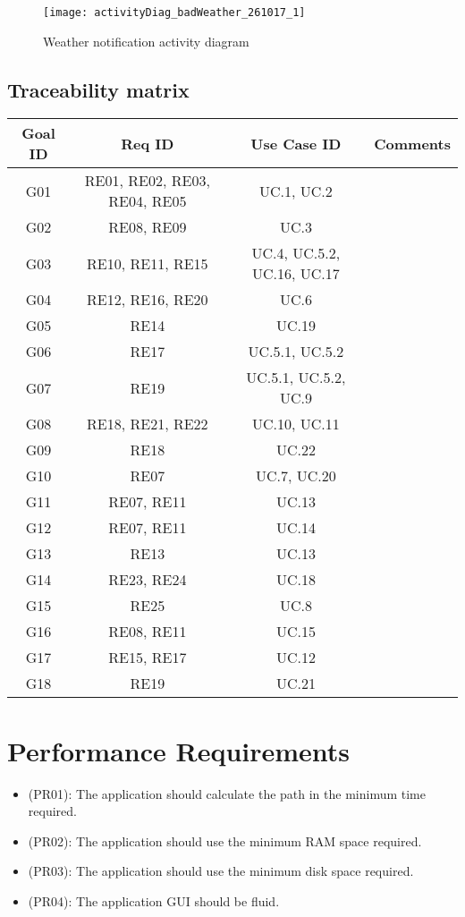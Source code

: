 \documentclass[a4paper,leqno]{book}
\begin{document}
\begin{figure}[!h]
	\begin{center}
		\texttt{[image: activityDiag\_badWeather\_261017\_1]}
	\end{center}
	\caption{Weather notification activity diagram}
\end{figure}

\subsection{Traceability matrix}
\begin{tabular}{|c|c|c|c|}
	\hline 
	\textbf{Goal ID}&  \textbf{Req ID}& \textbf{Use Case ID} & \textbf{Comments} \\ 
	\hline  \hline
	G01& RE01, RE02, RE03, RE04, RE05 &  UC.1, UC.2&  \\ 
	\hline 
	G02&  RE08, RE09& UC.3 &  \\ 
	\hline 
	G03& RE10, RE11, RE15& UC.4, UC.5.2, UC.16, UC.17   &  \\ 
	\hline 
	G04& RE12, RE16, RE20 & UC.6 &  \\ 
	\hline 
	G05&  RE14& UC.19 &  \\ 
	\hline 
	G06&  RE17 & UC.5.1, UC.5.2  &  \\ 
	\hline 
	G07&  RE19& UC.5.1, UC.5.2, UC.9  &  \\ 
	\hline 
	G08&  RE18, RE21, RE22 &  UC.10, UC.11 &  \\ 
	\hline 
	G09& RE18  & UC.22 &  \\ 
	\hline 
	G10& RE07 & UC.7, UC.20&  \\ 
	\hline 
	G11&  RE07, RE11 & UC.13 &  \\ 
	\hline 
	G12& RE07, RE11 & UC.14 &  \\ 
	\hline 
	G13& RE13 & UC.13 &  \\ 
	\hline 
	G14&  RE23, RE24& UC.18  &  \\ 
	\hline 
	G15& RE25 & UC.8 &  \\ 
	\hline 
	G16& RE08, RE11& UC.15 &  \\ 
	\hline 
	G17& RE15, RE17 & UC.12 &  \\ 
		\hline 
	G18& RE19 & UC.21 &  \\ 
	\hline 
\end{tabular} 


\newpage
\section{Performance Requirements}
\begin{itemize}
\item (PR01): The application should calculate the path in the minimum time required.
\item (PR02): The application should use the minimum RAM space required.
\item (PR03): The application should use the minimum disk space required.
\item (PR04): The application GUI should be fluid.
\end{itemize}
\end{document}
